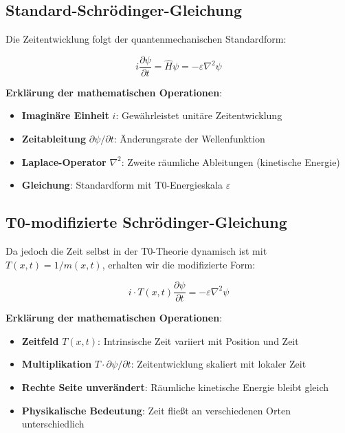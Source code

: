	\subsection{Standard-Schrödinger-Gleichung}
	
	Die Zeitentwicklung folgt der quantenmechanischen Standardform:
	
	\begin{equation}
		i\frac{\partial\psi}{\partial t} = \hat{H}\psi = -\varepsilon \nabla^2 \psi
		\label{eq:standard_schrodinger_t0}
	\end{equation}
	
	\textbf{Erklärung der mathematischen Operationen}:
	\begin{itemize}
		\item \textbf{Imaginäre Einheit} $i$: Gewährleistet unitäre Zeitentwicklung
		\item \textbf{Zeitableitung} $\partial\psi/\partial t$: Änderungsrate der Wellenfunktion
		\item \textbf{Laplace-Operator} $\nabla^2$: Zweite räumliche Ableitungen (kinetische Energie)
		\item \textbf{Gleichung}: Standardform mit T0-Energieskala $\varepsilon$
	\end{itemize}
	
	\subsection{T0-modifizierte Schrödinger-Gleichung}
	
	Da jedoch die Zeit selbst in der T0-Theorie dynamisch ist mit $T(x,t) = 1/m(x,t)$, erhalten wir die modifizierte Form:
	
	\begin{equation}
		\boxed{i \cdot T(x,t) \frac{\partial\psi}{\partial t} = -\varepsilon \nabla^2 \psi}
		\label{eq:t0_modified_schrodinger}
	\end{equation}
	
	\textbf{Erklärung der mathematischen Operationen}:
	\begin{itemize}
		\item \textbf{Zeitfeld} $T(x,t)$: Intrinsische Zeit variiert mit Position und Zeit
		\item \textbf{Multiplikation} $T \cdot \partial\psi/\partial t$: Zeitentwicklung skaliert mit lokaler Zeit
		\item \textbf{Rechte Seite unverändert}: Räumliche kinetische Energie bleibt gleich
		\item \textbf{Physikalische Bedeutung}: Zeit fließt an verschiedenen Orten unterschiedlich
	\end{itemize}
	
